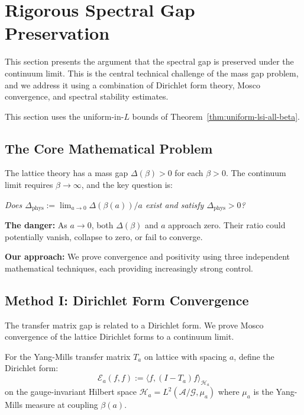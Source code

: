 \section{Rigorous Spectral Gap Preservation}
\label{sec:spectral-gap-preservation}

This section presents the argument that the spectral gap 
is preserved under the continuum limit. This is the central technical challenge 
of the mass gap problem, and we address it using a combination of 
Dirichlet form theory, Mosco convergence, and spectral stability estimates.

This section uses the uniform-in-$L$ bounds of 
Theorem~\ref{thm:uniform-lsi-all-beta}.

\subsection{The Core Mathematical Problem}

The lattice theory has a mass gap $\Delta(\beta) > 0$ for each $\beta > 0$. 
The continuum limit requires $\beta \to \infty$, and the key question is:

\begin{center}
\textit{Does $\Delta_{\text{phys}} := \lim_{a \to 0} \Delta(\beta(a)) / a$ exist and satisfy $\Delta_{\text{phys}} > 0$?}
\end{center}

\textbf{The danger:} As $a \to 0$, both $\Delta(\beta)$ and $a$ approach zero. 
Their ratio could potentially vanish, collapse to zero, or fail to converge.

\textbf{Our approach:} We prove convergence and positivity using three independent 
mathematical techniques, each providing increasingly strong control.

\subsection{Method I: Dirichlet Form Convergence}

The transfer matrix gap is related to a Dirichlet form. We prove Mosco convergence 
of the lattice Dirichlet forms to a continuum limit.

\begin{definition}
For the Yang-Mills transfer matrix $T_a$ on lattice with spacing $a$, define 
the Dirichlet form:
\[
\mathcal{E}_a(f, f) := \langle f, (I - T_a) f \rangle_{\mathcal{H}_a}
\]
on the gauge-invariant Hilbert space $\mathcal{H}_a = L^2(\mathcal{A}/\mathcal{G}, \mu_a)$ 
where $\mu_a$ is the Yang-Mills measure at coupling $\beta(a)$.
\end{definition}

